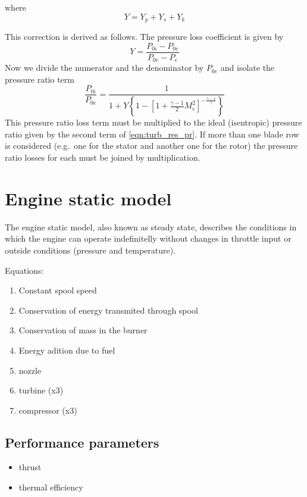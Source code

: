 \documentclass[tcc]{subfiles}
\begin{document}
where
\begin{equation}
    Y = Y_p + Y_s + Y_k
\end{equation}

This correction is derived as follows. The pressure loss coefficient is given by
\begin{equation}
    Y = \frac{P_{0i} - P_{0e}}{P_{0e} - P_e}
\end{equation}
Now we divide the numerator and the denominator by $P_{0e}$ and isolate the pressure ratio term 
\begin{equation}
    \frac{P_{0i}}{P_{0e}} = \frac{1}{1+Y\left\{1-\left[1+\tfrac{\gamma-1}{2}M_e^2\right]^{-\frac{\gamma-1}{\gamma}}\right\}}
\end{equation}
This pressure ratio loss term must be multiplied to the ideal (isentropic) pressure ratio given by the second term of \cref{eqn:turb_res_pr}. If more than one blade row is considered (e.g.\ one for the stator and another one for the rotor) the pressure ratio losses for each must be joined by multiplication.




\section{Engine static model}


The engine static model, also known as steady state, 
describes the conditions in which the engine can operate indefinitelly 
without changes in throttle input or outside conditions (pressure and temperature).


Equations:
\begin{enumerate}
    \item Constant spool speed
    \item Conservation of energy transmited through spool
    \item Conservation of mass in the burner
    \item Energy adition due to fuel
    \item nozzle
    \item turbine (x3)
    \item compressor (x3)
\end{enumerate}



\subsection{Performance parameters}
\begin{itemize}
    \item thrust
    \item thermal efficiency
\end{itemize}
\end{document}
